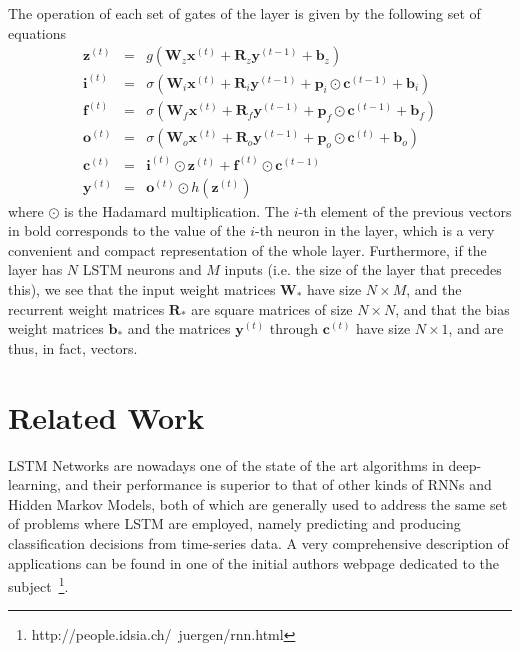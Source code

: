 \documentclass{IEEEtran}
\newcommand{\mb}[1]{\mathbf{#1}}
\begin{document}
The operation of each set of gates of the layer is given by the following set of equations
\begin{eqnarray}
    \mb{z}^{(t)} & = & g(\mb{W}_z \mb{x}^{(t)} + \mb{R}_z \mb{y}^{(t-1)} + \mb{b}_z) \nonumber\\
    \mb{i}^{(t)} & = & \sigma(\mb{W}_i \mb{x}^{(t)} + \mb{R}_i \mb{y}^{(t-1)} + \mb{p}_i \odot \mb{c}^{(t-1)} + \mb{b}_i) \nonumber\\
    \mb{f}^{(t)} & = & \sigma(\mb{W}_f \mb{x}^{(t)} + \mb{R}_f \mb{y}^{(t-1)} + \mb{p}_f \odot \mb{c}^{(t-1)} + \mb{b}_f) \nonumber\\
    \mb{o}^{(t)} & = & \sigma(\mb{W}_o \mb{x}^{(t)} + \mb{R}_o \mb{y}^{(t-1)} + \mb{p}_o \odot \mb{c}^{(t)} + \mb{b}_o) \nonumber\\
    \mb{c}^{(t)} & = & \mb{i}^{(t)} \odot \mb{z}^{(t)} + \mb{f}^{(t)} \odot \mb{c}^{(t-1)} \nonumber \\
    \mb{y}^{(t)} & = & \mb{o}^{(t)} \odot h(\mb{z}^{(t)}) \label{eq:equationsLSTM}
\end{eqnarray}
where $\odot$ is the Hadamard multiplication. The $i$-th element of the previous vectors in bold corresponds
to the value of the $i$-th neuron in the layer, which is a very convenient and compact representation of the
whole layer. Furthermore, if the layer has $N$ LSTM neurons and $M$ inputs (i.e. the size of the layer that
precedes this), we see that the input weight matrices $\mb{W}_*$ have size $N \times M$, and the  recurrent
weight matrices $\mb{R}_*$ are square matrices of size $N \times N$, and that the bias weight matrices $\mb{b}_*$
and the matrices $\mb{y}^{(t)}$ through $\mb{c}^{(t)}$ have size $N \times 1$, and are thus, in fact, vectors.

\section{Related Work}\label{sec:relwork}
LSTM Networks are nowadays one of the state of the art algorithms in deep-learning, and their performance is
superior to that of other kinds of RNNs and Hidden Markov Models, both of which are generally used to address
the same set of problems where LSTM are employed, namely predicting and producing classification decisions
from time-series data. A very comprehensive description of applications can be found in one of the initial
authors webpage dedicated to the subject~\footnote{http://people.idsia.ch/~juergen/rnn.html}.
\end{document}
